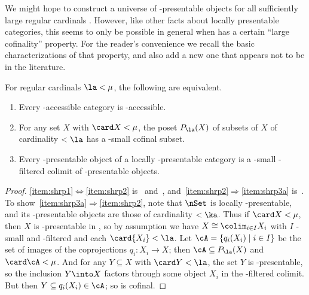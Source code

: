 We might hope to construct a universe of \ka-presentable objects for all sufficiently large regular cardinals \ka.
However, like other facts about locally presentable categories, this seems to only be possible in general when \ka has a certain ``large cofinality'' property.
For the reader's convenience we recall the basic characterizations of that property, and also add a new one that appears not to be in the literature.

\begin{prop}\label{thm:shrp}
  For regular cardinals $\la<\mu$, the following are equivalent.
  \begin{enumerate}
  \item Every \la-accessible category is \mu-accessible.\label{item:shrp1}
  \item For any set $X$ with $\card X <\mu$, the poset $P_\la(X)$ of subsets of $X$ of cardinality $<\la$ has a \mu-small cofinal subset.\label{item:shrp2}
  \item Every \mu-presentable object of a locally \la-presentable category is a \mu-small \la-filtered colimit of \la-presentable objects.\label{item:shrp3a}
  \end{enumerate}
\end{prop}
\begin{proof}
  \ref{item:shrp1}$\Leftrightarrow$\ref{item:shrp2} is~\cite[Theorem 2.11]{ar:loc-pres} and~\cite[]{mp:accessible}, and~\ref{item:shrp2}$\Rightarrow$\ref{item:shrp3a} is~\cite[Proposition 2.3.11]{mp:accessible}. %
  To show~\ref{item:shrp3a}$\Rightarrow$\ref{item:shrp2}, note that $\nSet$ is locally \la-presentable, and its \ka-presentable objects are those of cardinality $<\ka$.
  Thus if $\card X<\mu$, then $X$ is \mu-presentable in \nSet, so by assumption we have $X \cong \colim_{i\in I} X_i$ with $I$ \mu-small and \la-filtered and each $\card {X_i}<\la$.
  Let $\cA = \{ q_i(X_i) \mid i\in I \}$ be the set of images of the coprojections $q_i:X_i\to X$; then $\cA \subseteq P_\la(X)$ and $\card\cA<\mu$.
  And for any $Y\subseteq X$ with $\card Y<\la$, the set $Y$ is \la-presentable, so the inclusion $Y\into X$ factors through some object $X_i$ in the \la-filtered colimit.
  But then $Y \subseteq q_i(X_i) \in \cA$; so \cA is cofinal.
\end{proof}

